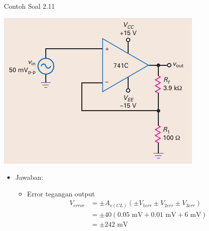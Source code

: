 \begin{frame}{Contoh Soal 2.11}
	\begin{multicols}{2}
		\begin{center}
			\includegraphics[width=\linewidth]{gambar/fig-16.22a}
		\end{center}
		\columnbreak
		\begin{itemize}
			\item Jawaban:
			\begin{itemize}
				\item Error tegangan output
				\begin{align*}
					V_{error} &= \pm A_{v(CL)}(\pm V_{1err} \pm V_{2err} \pm V_{3err}) \\
					&= \pm 40 (0.05 \text{ mV} + 0.01 \text{ mV} + 6 \text{ mV}) \\
					&= \pm 242 \text{ mV}
				\end{align*}
			\end{itemize}
		\end{itemize}
	\end{multicols}
\end{frame}